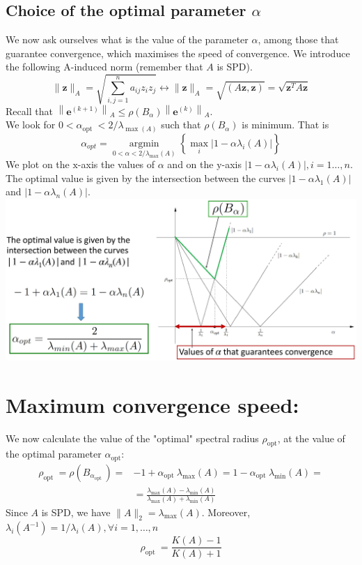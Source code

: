\documentclass[11pt]{book}
\begin{document}
\subsection*{Choice of the optimal parameter $\alpha$}
We now ask ourselves what is the value of the parameter $\alpha$, among those that guarantee convergence, which maximises the speed of convergence.
We introduce the following A-induced norm (remember that $A$ is SPD).
$$
\|\boldsymbol{z}\|_{A}=\sqrt{\sum_{i, j=1}^{n} a_{i j} z_{i} z_{j}} \longleftrightarrow\|\boldsymbol{z}\|_{A}=\sqrt{(A \boldsymbol{z}, \boldsymbol{z})}=\sqrt{\boldsymbol{z}^{T} A \boldsymbol{z}}
$$
Recall that $\left\|\boldsymbol{e}^{(k+1)}\right\|_{A} \leq \rho\left(B_{\alpha}\right)\left\|\boldsymbol{e}^{(k)}\right\|_{A}$.\\
We look for $0<\alpha_{\text {opt }}<2 / \lambda_{\max (A)}$ such that $\rho\left(B_{\alpha}\right)$ is minimum. That is
$$
\alpha_{o p t}=\underset{0<\alpha<2 / \lambda_{\max }(A)}{\operatorname{argmin}}\left\{\max _{i}\left|1-\alpha \lambda_{i}(A)\right|\right\}
$$
We plot on the $\mathrm{x}$-axis the values of $\alpha$ and on the $\mathrm{y}$-axis $\left|1-\alpha \lambda_{i}(A)\right|, i=1 \ldots, n$.
The optimal value is given by the intersection between the curves $\left|1-\alpha \lambda_{1}(A)\right|$ and $\left|1-\alpha \lambda_{n}(A)\right|$.\\
\includegraphics[max width=\textwidth, center]{2023_09_05_b72ccc85584d9dc6fb5cg-061}

\section*{Maximum convergence speed:}
We now calculate the value of the "optimal" spectral radius $\rho_{\mathrm{opt}}$, at the value of the optimal parameter $\alpha_{\mathrm{opt}}$:
$$
\begin{aligned}
\rho_{\text {opt }}=\rho\left(B_{\alpha_{\text {opt }}}\right)= & -1+\alpha_{\text {opt }} \lambda_{\max }(A)=1-\alpha_{\text {opt }} \lambda_{\min }(A)= \\
& =\frac{\lambda_{\max }(A)-\lambda_{\min }(A)}{\lambda_{\max }(A)+\lambda_{\min }(A)}
\end{aligned}
$$
Since $A$ is SPD, we have $\|A\|_2=\lambda_{\max }(A)$. Moreover, $\lambda_i\left(A^{-1}\right)=1 / \lambda_i(A), \forall i=1, \ldots, n$
$$
\rho_{\text {opt }}=\frac{K(A)-1}{K(A)+1}
$$
\end{document}
